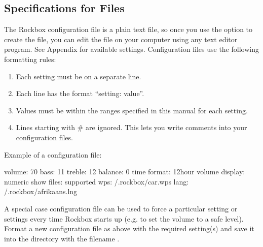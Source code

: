 \subsection{\label{ref:cfg_specs}Specifications for  Files}

The Rockbox configuration file is a plain text file, so once you use the 
 option to create the file, you can edit the file on 
your computer using any text editor program. See
Appendix  for available settings. Configuration 
files use the following formatting rules: %

\begin{enumerate} 
\item Each setting must be on a separate line. 
\item Each line has the format ``setting: value''. 
\item Values must be within the ranges specified in this manual for each 
  setting. 
\item Lines starting with \# are ignored. This lets you write comments into 
  your configuration files. 
\end{enumerate}

Example of a configuration file:
\begin{example}
    volume: 70
    bass: 11
    treble: 12
    balance: 0
    time format: 12hour
    volume display: numeric
    show files: supported
    wps: /.rockbox/car.wps
    lang: /.rockbox/afrikaans.lng
\end{example}


  A special case configuration file can be used to force a particular setting
  or settings every time Rockbox starts up (e.g. to set the volume to a safe
  level). Format a new configuration file as above with the required setting(s)
  and save it into the  directory with the filename
  .


